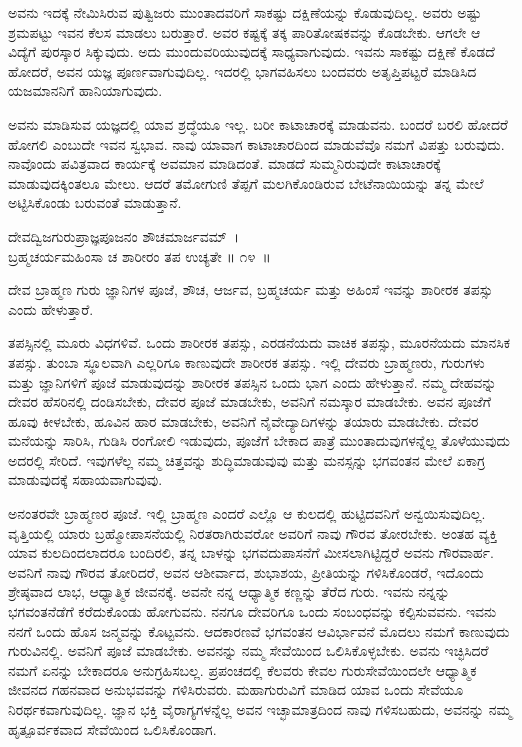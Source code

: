 ಅವನು ಇದಕ್ಕೆ ನೇಮಿಸಿರುವ ಪುತ್ವಿಜರು ಮುಂತಾದವರಿಗೆ ಸಾಕಷ್ಟು ದಕ್ಷಿಣೆಯನ್ನು ಕೊಡುವುದಿಲ್ಲ. ಅವರು ಅಷ್ಟು ಶ್ರಮಪಟ್ಟು ಇವನ ಕೆಲಸ ಮಾಡಲು ಬರುತ್ತಾರೆ. ಅವರ ಕಷ್ಟಕ್ಕೆ ತಕ್ಕ ಪಾರಿತೋಷಕವನ್ನು ಕೊಡಬೇಕು. ಆಗಲೇ ಆ ವಿದ್ಯೆಗೆ ಪುರಸ್ಕಾರ ಸಿಕ್ಕುವುದು. ಅದು ಮುಂದುವರಿಯುವುದಕ್ಕೆ ಸಾಧ್ಯವಾಗುವುದು. ಇವನು ಸಾಕಷ್ಟು ದಕ್ಷಿಣೆ ಕೊಡದೆ ಹೋದರೆ, ಅವನ ಯಜ್ಞ ಪೂರ್ಣವಾಗುವುದಿಲ್ಲ. ಇದರಲ್ಲಿ ಭಾಗವಹಿಸಲು ಬಂದವರು ಅತೃಪ್ತಿಪಟ್ಟರೆ ಮಾಡಿಸಿದ ಯಜಮಾನನಿಗೆ ಹಾನಿಯಾಗುವುದು.

ಅವನು ಮಾಡಿಸುವ ಯಜ್ಞದಲ್ಲಿ ಯಾವ ಶ್ರದ್ಧೆಯೂ ಇಲ್ಲ. ಬರೀ ಕಾಟಾಚಾರಕ್ಕೆ ಮಾಡುವನು. ಬಂದರೆ ಬರಲಿ ಹೋದರೆ ಹೋಗಲಿ ಎಂಬುದೇ ಇವನ ಸ್ವಭಾವ. ನಾವು ಯಾವಾಗ ಕಾಟಾಚಾರದಿಂದ ಮಾಡುವೆವೊ ನಮಗೆ ವಿಪತ್ತು ಬರುವುದು. ನಾವೊಂದು ಪವಿತ್ರವಾದ ಕಾರ್ಯಕ್ಕೆ ಅವಮಾನ ಮಾಡಿದಂತೆ. ಮಾಡದೆ ಸುಮ್ಮನಿರುವುದೇ ಕಾಟಾಚಾರಕ್ಕೆ ಮಾಡುವುದಕ್ಕಿಂತಲೂ ಮೇಲು. ಆದರೆ ತಮೋಗುಣಿ ತೆಪ್ಪಗೆ ಮಲಗಿಕೊಂಡಿರುವ ಬೇಟೆನಾಯಿಯನ್ನು ತನ್ನ ಮೇಲೆ ಅಟ್ಟಿಸಿಕೊಂಡು ಬರುವಂತೆ ಮಾಡುತ್ತಾನೆ.

\begin{shloka}
ದೇವದ್ವಿಜಗುರುಪ್ರಾಜ್ಞಪೂಜನಂ ಶೌಚಮಾರ್ಜವಮ್~।\\ಬ್ರಹ್ಮಚರ್ಯಮಹಿಂಸಾ ಚ ಶಾರೀರಂ ತಪ ಉಚ್ಯತೇ \hfill॥ ೧೪~॥
\end{shloka}

\newpage

\begin{artha}
ದೇವ ಬ್ರಾಹ್ಮಣ ಗುರು ಜ್ಞಾನಿಗಳ ಪೂಜೆ, ಶೌಚ, ಆರ್ಜವ, ಬ್ರಹ್ಮಚರ್ಯ ಮತ್ತು ಅಹಿಂಸೆ ಇವನ್ನು ಶಾರೀರಕ ತಪಸ್ಸು ಎಂದು ಹೇಳುತ್ತಾರೆ.
\end{artha}

ತಪಸ್ಸಿನಲ್ಲಿ ಮೂರು ವಿಧಗಳಿವೆ. ಒಂದು ಶಾರೀರಕ ತಪಸ್ಸು, ಎರಡನೆಯದು ವಾಚಿಕ ತಪಸ್ಸು, ಮೂರನೆಯದು ಮಾನಸಿಕ ತಪಸ್ಸು. ತುಂಬಾ ಸ್ಥೂಲವಾಗಿ ಎಲ್ಲರಿಗೂ ಕಾಣುವುದೇ ಶಾರೀರಕ ತಪಸ್ಸು. ಇಲ್ಲಿ ದೇವರು ಬ್ರಾಹ್ಮಣರು, ಗುರುಗಳು ಮತ್ತು ಜ್ಞಾನಿಗಳಿಗೆ ಪೂಜೆ ಮಾಡುವುದನ್ನು ಶಾರೀರಕ ತಪಸ್ಸಿನ ಒಂದು ಭಾಗ ಎಂದು ಹೇಳುತ್ತಾನೆ. ನಮ್ಮ ದೇಹವನ್ನು ದೇವರ ಹೆಸರಿನಲ್ಲಿ ದಂಡಿಸಬೇಕು, ದೇವರ ಪೂಜೆ ಮಾಡಬೇಕು, ಅವನಿಗೆ ನಮಸ್ಕಾರ ಮಾಡಬೇಕು. ಅವನ ಪೂಜೆಗೆ ಹೂವು ಕೀಳಬೇಕು, ಹೂವಿನ ಹಾರ ಮಾಡಬೇಕು, ಅವನಿಗೆ ನೈವೇದ್ಯಾದಿಗಳನ್ನು ತಯಾರು ಮಾಡಬೇಕು. ದೇವರ ಮನೆಯನ್ನು ಸಾರಿಸಿ, ಗುಡಿಸಿ ರಂಗೋಲಿ ಇಡುವುದು, ಪೂಜೆಗೆ ಬೇಕಾದ ಪಾತ್ರೆ ಮುಂತಾದುವುಗಳನ್ನೆಲ್ಲ ತೊಳೆಯುವುದು ಅದರಲ್ಲಿ ಸೇರಿದೆ. ಇವುಗಳೆಲ್ಲ ನಮ್ಮ ಚಿತ್ತವನ್ನು ಶುದ್ಧಿಮಾಡುವುವು ಮತ್ತು ಮನಸ್ಸನ್ನು ಭಗವಂತನ ಮೇಲೆ ಏಕಾಗ್ರ ಮಾಡುವುದಕ್ಕೆ ಸಹಾಯವಾಗುವುವು.

ಅನಂತರವೇ ಬ್ರಾಹ್ಮಣರ ಪೂಜೆ. ಇಲ್ಲಿ ಬ್ರಾಹ್ಮಣ ಎಂದರೆ ಎಲ್ಲೊ ಆ ಕುಲದಲ್ಲಿ ಹುಟ್ಟಿದವನಿಗೆ ಅನ್ವಯಿಸುವುದಿಲ್ಲ. ವೃತ್ತಿಯಲ್ಲಿ ಯಾರು ಬ್ರಹ್ಮೋಪಾಸನೆಯಲ್ಲಿ ನಿರತರಾಗಿರುವರೋ ಅವರಿಗೆ ನಾವು ಗೌರವ ತೋರಬೇಕು. ಅಂತಹ ವ್ಯಕ್ತಿ ಯಾವ ಕುಲದಿಂದಲಾದರೂ ಬಂದಿರಲಿ, ತನ್ನ ಬಾಳನ್ನು ಭಗವದುಪಾಸನೆಗೆ ಮೀಸಲಾಗಿಟ್ಟಿದ್ದರೆ ಅವನು ಗೌರವಾರ್ಹ. ಅವನಿಗೆ ನಾವು ಗೌರವ ತೋರಿದರೆ, ಅವನ ಆಶೀರ್ವಾದ, ಶುಭಾಶಯ, ಪ್ರೀತಿಯನ್ನು ಗಳಿಸಿಕೊಂಡರೆ, ಇದೊಂದು ಶ್ರೇಷ್ಠವಾದ ಲಾಭ, ಆಧ್ಯಾತ್ಮಿಕ ಜೀವನಕ್ಕೆ. ಅವನೇ ನನ್ನ ಆಧ್ಯಾತ್ಮಿಕ ಕಣ್ಣನ್ನು ತೆರೆದ ಗುರು. ಇವನು ನನ್ನನ್ನು ಭಗವಂತನೆಡೆಗೆ ಕರೆದುಕೊಂಡು ಹೋಗುವನು. ನನಗೂ ದೇವರಿಗೂ ಒಂದು ಸಂಬಂಧವನ್ನು ಕಲ್ಪಿಸುವವನು. ಇವನು ನನಗೆ ಒಂದು ಹೊಸ ಜನ್ಮವನ್ನು ಕೊಟ್ಟವನು. ಆದಕಾರಣವೆ ಭಗವಂತನ ಆವಿರ್ಭಾವನೆ ಮೊದಲು ನಮಗೆ ಕಾಣುವುದು ಗುರುವಿನಲ್ಲಿ. ಅವನಿಗೆ ಪೂಜೆ ಮಾಡಬೇಕು. ಅವನನ್ನು ನಮ್ಮ ಸೇವೆಯಿಂದ ಒಲಿಸಿಕೊಳ್ಳಬೇಕು. ಅವನು ಇಚ್ಛಿಸಿದರೆ ನಮಗೆ ಏನನ್ನು ಬೇಕಾದರೂ ಅನುಗ್ರಹಿಸಬಲ್ಲ. ಪ್ರಪಂಚದಲ್ಲಿ ಕೆಲವರು ಕೇವಲ ಗುರುಸೇವೆಯಿಂದಲೇ ಆಧ್ಯಾತ್ಮಿಕ ಜೀವನದ ಗಹನವಾದ ಅನುಭವವನ್ನು ಗಳಿಸಿರುವರು. ಮಹಾಗುರುವಿಗೆ ಮಾಡಿದ ಯಾವ ಒಂದು ಸೇವೆಯೂ ನಿರರ್ಥಕವಾಗುವುದಿಲ್ಲ. ಜ್ಞಾನ ಭಕ್ತಿ ವೈರಾಗ್ಯಗಳನ್ನೆಲ್ಲ ಅವನ ಇಚ್ಛಾಮಾತ್ರದಿಂದ ನಾವು ಗಳಿಸಬಹುದು, ಅವನನ್ನು ನಮ್ಮ ಹೃತ್ಪೂರ್ವಕವಾದ ಸೇವೆಯಿಂದ ಒಲಿಸಿಕೊಂಡಾಗ.

